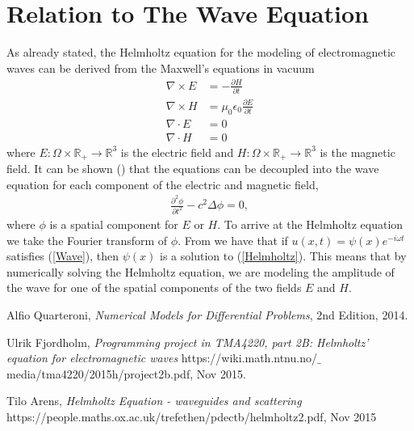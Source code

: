 \documentclass[10pt,a4paper]{article}
\begin{document}
\section*{Relation to The Wave Equation}
As already stated, the Helmholtz equation for the modeling of electromagnetic waves can be derived from the Maxwell's equations in vacuum
\begin{align*}
\nabla \times E &= - \frac{\partial H}{\partial t} \\
\nabla \times H &= \mu_0 \epsilon _0 \frac{\partial E}{\partial t} \\
\nabla \cdot E &= 0 \\
\nabla \cdot H &= 0
\end{align*}
where $E: \Omega \times \mathbb{R}_+ \rightarrow \mathbb{R}^3$ is the electric field and $H: \Omega \times \mathbb{R}_+ \rightarrow \mathbb{R}^3$ is the magnetic field. It can be shown (\cite{Project}) that the equations can be decoupled into the wave equation for each component of the electric and magnetic field,
\begin{equation}
\begin{aligned}
\label{Wave}
\frac{\partial^2 \phi}{\partial t^2} - c^2 \Delta \phi = 0, 
\end{aligned}
\end{equation}
where $\phi$ is a spatial component for $E$ or $H$. To arrive at the Helmholtz equation we take the Fourier transform of $\phi$. From \cite{Helmholtz-Wave} we have that if $u(x,t) = \psi (x)e^{-i \omega t}$ satisfies (\ref{Wave}), then $\psi (x)$ is a solution to (\ref{Helmholtz}). This means that by numerically solving the Helmholtz equation, we are modeling the amplitude of the wave for one of the spatial components of the two fields $E$ and $H$.
\begin{thebibliography}{}

Alfio Quarteroni, \emph{Numerical Models for Differential Problems}, 2nd Edition, 2014.

Ulrik Fjordholm, \emph{Programming project in TMA4220, part 2B:
Helmholtz' equation for electromagnetic waves} https://wiki.math.ntnu.no/$\_$media/tma4220/2015h/project2b.pdf, Nov 2015.

Tilo Arens, \emph{Helmholtz Equation - waveguides and scattering} https://people.maths.ox.ac.uk/trefethen/pdectb/helmholtz2.pdf, Nov 2015


\end{thebibliography}
\end{document}
